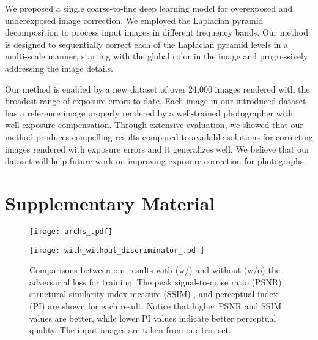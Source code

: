 \documentclass[final]{cvpr}
\begin{document}
We proposed a single coarse-to-fine deep learning model for overexposed and underexposed image correction. We employed the Laplacian pyramid decomposition to process input images in different frequency bands. Our method is designed to sequentially correct each of the Laplacian pyramid levels in a multi-scale manner, starting with the global color in the image and progressively addressing the image details. 

Our method is enabled by a new dataset of over 24,000 images rendered with the broadest range of exposure errors to date. Each image in our introduced dataset has a reference image properly rendered by a well-trained photographer with well-exposure compensation. Through extensive evaluation, we showed that our method produces compelling results compared to available solutions for correcting images rendered with exposure errors and it generalizes well. We believe that our dataset will help future work on improving exposure correction for photographs.










\newcommand{\beginsupplement}{\setcounter{table}{0}
        \renewcommand{\thetable}{S\arabic{table}}\setcounter{figure}{0}
        \renewcommand{\thefigure}{S\arabic{figure}}}

\section{Supplementary Material}
\beginsupplement


\begin{figure*}[]
\centering
\vspace{-1mm}
\texttt{[image: archs\_.pdf]}
\vspace{-6mm}
 \label{fig:arch}
\end{figure*}

\begin{figure*}[]
\centering
\texttt{[image: with\_without\_discriminator\_.pdf]}
\vspace{-2mm}
\caption{Comparisons between our results with (w/) and without (w/o) the adversarial loss for training. The peak signal-to-noise ratio (PSNR), structural similarity index measure (SSIM) \cite{wang2004image}, and perceptual index (PI) \cite{blau20182018} are shown for each result. Notice that higher PSNR and SSIM values are better, while lower PI values indicate better perceptual quality. The input images are taken from our test set.\vspace{-2mm}} \label{fig:ablation-with_without_discriminator}
\end{figure*}
\end{document}
